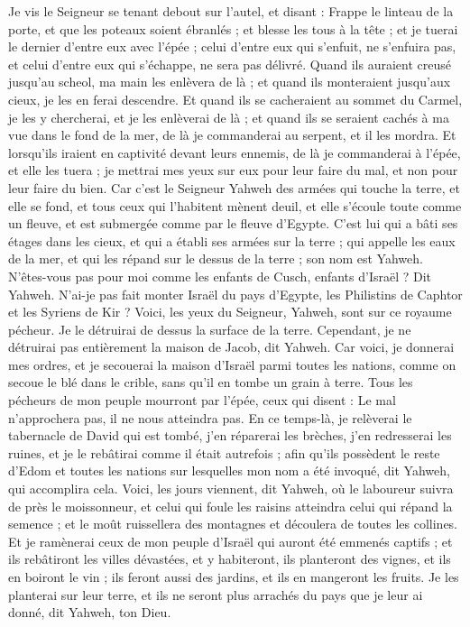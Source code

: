 \begin{multicols}{2}
\VerseOne{}Je vis le Seigneur se tenant debout sur l'autel, et disant : Frappe le linteau de la porte, et que les poteaux soient ébranlés ; et blesse les tous à la tête ; et je tuerai le dernier d'entre eux avec l'épée ; celui d'entre eux qui s'enfuit, ne s'enfuira pas, et celui d'entre eux qui s'échappe, ne sera pas délivré.
Quand ils auraient creusé jusqu'au scheol, ma main les enlèvera de là ; et quand ils monteraient jusqu'aux cieux, je les en ferai descendre.
Et quand ils se cacheraient au sommet du Carmel, je les y chercherai, et je les enlèverai de là ; et quand ils se seraient cachés à ma vue dans le fond de la mer, de là je commanderai au serpent, et il les mordra.
Et lorsqu'ils iraient en captivité devant leurs ennemis, de là je commanderai à l'épée, et elle les tuera ; je mettrai mes yeux sur eux pour leur faire du mal, et non pour leur faire du bien.
Car c'est le Seigneur Yahweh des armées qui touche la terre, et elle se fond, et tous ceux qui l'habitent mènent deuil, et elle s'écoule toute comme un fleuve, et est submergée comme par le fleuve d'Egypte. 
C'est lui qui a bâti ses étages dans les cieux, et qui a établi ses armées sur la terre ; qui appelle les eaux de la mer, et qui les répand sur le dessus de la terre ; son nom est Yahweh. 
N'êtes-vous pas pour moi comme les enfants de Cusch, enfants d'Israël ? Dit Yahweh. N'ai-je pas fait monter Israël du pays d'Egypte, les Philistins de Caphtor et les Syriens de Kir ?
Voici, les yeux du Seigneur, Yahweh, sont sur ce royaume pécheur. Je le détruirai de dessus la surface de la terre. Cependant, je ne détruirai pas entièrement la maison de Jacob, dit Yahweh.
Car voici, je donnerai mes ordres, et je secouerai la maison d'Israël parmi toutes les nations, comme on secoue le blé dans le crible, sans qu'il en tombe un grain à terre.
Tous les pécheurs de mon peuple mourront par l'épée, ceux qui disent : Le mal n'approchera pas, il ne nous atteindra pas.
En ce temps-là, je relèverai le tabernacle de David qui est tombé, j'en réparerai les brèches, j'en redresserai les ruines, et je le rebâtirai comme il était autrefois ;
afin qu'ils possèdent le reste d'Edom et toutes les nations sur lesquelles mon nom a été invoqué, dit Yahweh, qui accomplira cela.
Voici, les jours viennent, dit Yahweh, où le laboureur suivra de près le moissonneur, et celui qui foule les raisins atteindra celui qui répand la semence ; et le moût ruissellera des montagnes et découlera de toutes les collines.
Et je ramènerai ceux de mon peuple d'Israël qui auront été emmenés captifs ; et ils rebâtiront les villes dévastées, et y habiteront, ils planteront des vignes, et ils en boiront le vin ; ils feront aussi des jardins, et ils en mangeront les fruits.
Je les planterai sur leur terre, et ils ne seront plus arrachés du pays que je leur ai donné, dit Yahweh, ton Dieu.
\PPE{}
\end{multicols}
